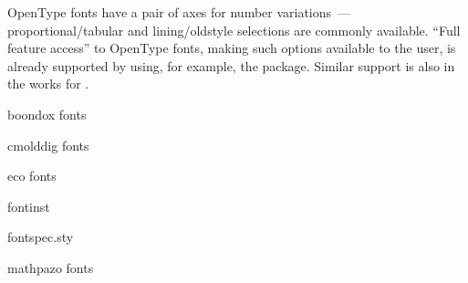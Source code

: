 OpenType fonts have a pair of axes for number variations~---
proportional/tabular and lining/oldstyle selections are commonly
available.  ``Full feature access'' to OpenType fonts, making such
options available to the \AllTeX{} user, is already supported by
 using, for example, the 
package.  Similar support is also in the works for
.
\begin{ctanrefs}
\item[boondox \nothtml{\rmfamily}fonts]
\item[cmolddig \nothtml{\rmfamily}fonts]
\item[eco \nothtml{\rmfamily}fonts]
\item[fontinst]
\item[fontspec.sty]
\item[mathpazo \nothtml{\rmfamily}fonts]
\end{ctanrefs}
